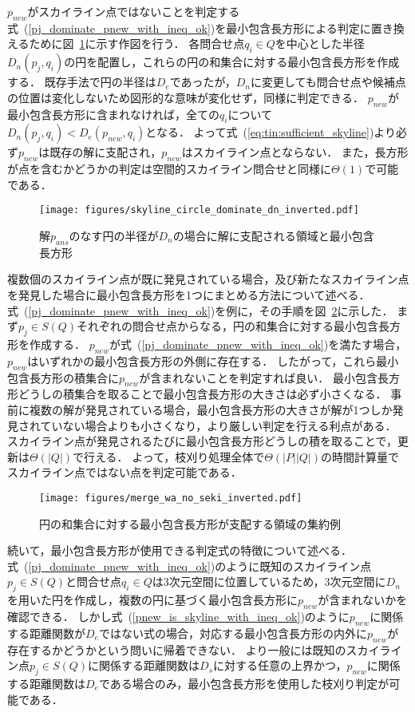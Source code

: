 \documentclass{fit}
\theoremstyle{definition}
\newcommand{\Fig}[1]{図~#1}
\newcommand{\Eq}[1]{式~(#1)}
\begin{document}
$p_{new}$がスカイライン点ではないことを判定する\Eq{\ref{pj_dominate_pnew_with_ineq_ok}}を最小包含長方形による判定に置き換えるために\Fig{\ref{fig:circle_dn}}に示す作図を行う．
各問合せ点$q_i \in Q$を中心とした半径$D_n(p_j,q_i)$の円を配置し，これらの円の和集合に対する最小包含長方形を作成する．
既存手法で円の半径は$D_e$であったが，$D_n$に変更しても問合せ点や候補点の位置は変化しないため図形的な意味が変化せず，同様に判定できる．
$p_{new}$が最小包含長方形に含まれなければ，全ての$q_i$について$D_n(p_j,q_i)<D_e(p_{new},q_i)$となる．
よって\Eq{\ref{eq:tin:sufficient_skyline}}より必ず$p_{new}$は既存の解に支配され，$p_{new}$はスカイライン点とならない．
また，長方形が点を含むかどうかの判定は空間的スカイライン問合せと同様に$\Theta(1)$で可能である．

\begin{figure}[t]
  \centering
  \texttt{[image: figures/skyline\_circle\_dominate\_dn\_inverted.pdf]}
  \caption{解$p_{ans}$のなす円の半径が$D_n$の場合に解に支配される領域と最小包含長方形}
  \label{fig:circle_dn}
\end{figure}

複数個のスカイライン点が既に発見されている場合，及び新たなスカイライン点を発見した場合に最小包含長方形を1つにまとめる方法について述べる．
\Eq{\ref{pj_dominate_pnew_with_ineq_ok}}を例に，その手順を\Fig{\ref{fig:wa_no_seki}}に示した．
まず$p_{j} \in S(Q)$それぞれの問合せ点からなる，円の和集合に対する最小包含長方形を作成する．
$p_{new}$が\Eq{\ref{pj_dominate_pnew_with_ineq_ok}}を満たす場合，$p_{new}$はいずれかの最小包含長方形の外側に存在する．
したがって，これら最小包含長方形の積集合に$p_{new}$が含まれないことを判定すれば良い．
最小包含長方形どうしの積集合を取ることで最小包含長方形の大きさは必ず小さくなる．
事前に複数の解が発見されている場合，最小包含長方形の大きさが解が1つしか発見されていない場合よりも小さくなり，より厳しい判定を行える利点がある．
スカイライン点が発見されるたびに最小包含長方形どうしの積を取ることで，更新は$\Theta (|Q|)$で行える．
よって，枝刈り処理全体で$\Theta (|P||Q|)$の時間計算量でスカイライン点ではない点を判定可能である．

\begin{figure}[t]
  \centering
  \texttt{[image: figures/merge\_wa\_no\_seki\_inverted.pdf]}
  \caption{円の和集合に対する最小包含長方形が支配する領域の集約例}
  \label{fig:wa_no_seki}
\end{figure}

続いて，最小包含長方形が使用できる判定式の特徴について述べる．
\Eq{\ref{pj_dominate_pnew_with_ineq_ok}}のように既知のスカイライン点$p_j \in S(Q)$と問合せ点$q_i \in Q$は3次元空間に位置しているため，3次元空間に$D_n$を用いた円を作成し，複数の円に基づく最小包含長方形に$p_{new}$が含まれないかを確認できる．
しかし\Eq{\ref{pnew_is_skyline_with_ineq_ok}}のように$p_{new}$に関係する距離関数が$D_e$ではない式の場合，対応する最小包含長方形の内外に$p_{new}$が存在するかどうかという問いに帰着できない．
より一般には既知のスカイライン点$p_j \in S(Q)$に関係する距離関数は$D_s$に対する任意の上界かつ，$p_{new}$に関係する距離関数は$D_e$である場合のみ，最小包含長方形を使用した枝刈り判定が可能である．
\end{document}
